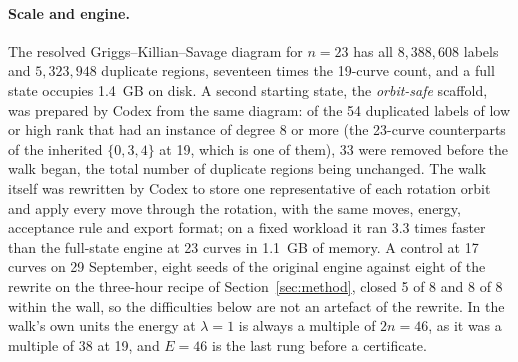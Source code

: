 \documentclass[11pt]{article}
\begin{document}
\paragraph{Scale and engine.} The resolved Griggs--Killian--Savage diagram for $n=23$ has all $8{,}388{,}608$ labels
and $5{,}323{,}948$ duplicate regions, seventeen times the 19-curve count, and a full state occupies 1.4~GB on disk. A
second starting state, the \emph{orbit-safe} scaffold, was prepared by Codex from the same diagram: of the 54 duplicated
labels of low or high rank that had an instance of degree 8 or more (the 23-curve counterparts of the
inherited $\{0,3,4\}$ at 19, which is one of them), 33 were removed before the walk began, the total number of
duplicate regions being unchanged. The walk itself was
rewritten by Codex to store one representative of each rotation orbit and apply every move through the rotation, with
the same moves, energy, acceptance rule and export format; on a fixed workload it ran 3.3 times faster than the
full-state engine at 23 curves in 1.1~GB of memory. A control at 17 curves on 29 September, eight seeds of the
original engine against eight of the rewrite on the three-hour recipe of Section~\ref{sec:method}, closed 5 of 8 and
8 of 8 within the wall, so the difficulties below are not an artefact of the rewrite. In the walk's own units the
energy at $\lambda=1$ is always a multiple of $2n=46$, as it was a multiple of $38$ at 19, and $E=46$ is the last
rung before a certificate.
\end{document}
